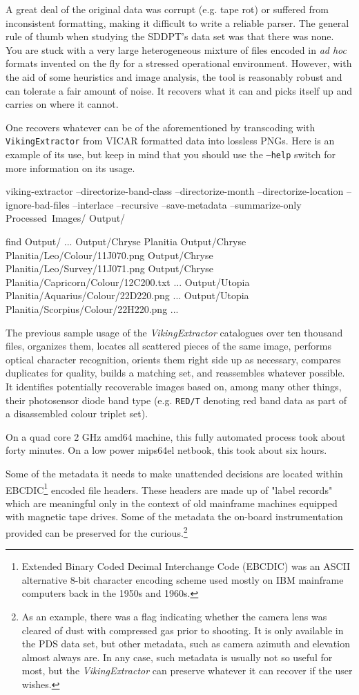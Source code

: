 A great deal of the original data was corrupt (e.g. tape rot) or suffered from inconsistent formatting, making it difficult to write a reliable parser. The general rule of thumb when studying the SDDPT's data set was that there was none. You are stuck with a very large heterogeneous mixture of files encoded in {\it ad hoc} formats invented on the fly for a stressed operational environment. However, with the aid of some heuristics and image analysis, the tool is reasonably robust and can tolerate a fair amount of noise. It recovers what it can and picks itself up and carries on where it cannot.

One recovers whatever can be of the aforementioned by transcoding with {\tt VikingExtractor} from VICAR formatted data into lossless PNGs. Here is an example of its use, but keep in mind that you should use the {\tt --help} switch for more information on its usage.

\startCodeExample
\type{$} viking-extractor --directorize-band-class --directorize-month --directorize-location --ignore-bad-files --interlace --recursive --save-metadata --summarize-only Processed\ Images/ Output/

\type{$} find Output/
...
Output/Chryse Planitia
Output/Chryse Planitia/Leo/Colour/11J070.png
Output/Chryse Planitia/Leo/Survey/11J071.png
Output/Chryse Planitia/Capricorn/Colour/12C200.txt
...
Output/Utopia Planitia/Aquarius/Colour/22D220.png
...
Output/Utopia Planitia/Scorpius/Colour/22H220.png
...
\stopCodeExample

The previous sample usage of the {\it VikingExtractor} catalogues over ten thousand files, organizes them, locates all scattered pieces of the same image, performs optical character recognition, orients them right side up as necessary, compares duplicates for quality, builds a matching set, and reassembles whatever possible. It identifies potentially recoverable images based on, among many other things, their photosensor diode band type (e.g. {\tt RED/T} denoting red band data as part of a disassembled colour triplet set). 

On a quad core 2 GHz amd64 machine, this fully automated process took about forty minutes. On a low power mips64el netbook, this took about six hours.

Some of the metadata it needs to make unattended decisions are located within EBCDIC\footnote{Extended Binary Coded Decimal Interchange Code (EBCDIC) was an ASCII alternative 8-bit character encoding scheme used mostly on IBM mainframe computers back in the 1950s and 1960s.} encoded file headers. These headers are made up of "label records" which are meaningful only in the context of old mainframe machines equipped with magnetic tape drives. Some of the metadata the on-board instrumentation provided can be preserved for the curious.\footnote{As an example, there was a flag indicating whether the camera lens was cleared of dust with compressed gas prior to shooting. It is only available in the PDS data set, but other metadata, such as camera azimuth and elevation almost always are. In any case, such metadata is usually not so useful for most, but the {\it VikingExtractor} can preserve whatever it can recover if the user wishes.}

